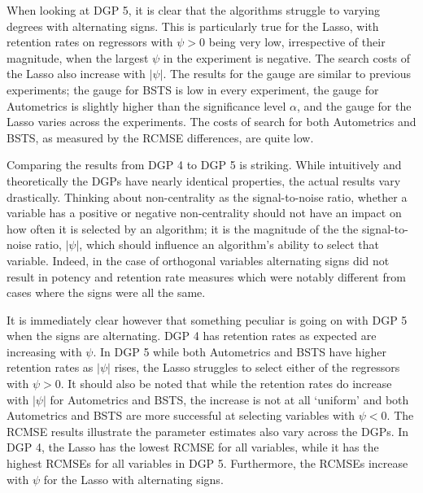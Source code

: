 When looking at DGP 5, it is clear that the algorithms struggle to varying degrees with alternating signs. This is particularly true for the Lasso, with retention rates on regressors with $\psi>0$ being very low, irrespective of their magnitude, when the largest $\psi$ in the experiment is negative. The search costs of the Lasso also increase with $|\psi|$. The results for the gauge are similar to previous experiments; the gauge for BSTS is low in every experiment, the gauge for Autometrics is slightly higher than the significance level $\alpha$, and the gauge for the Lasso varies across the experiments. The costs of search for both Autometrics and BSTS, as measured by the RCMSE differences, are quite low. 

Comparing the results from DGP 4 to DGP 5 is striking. While intuitively and theoretically the DGPs have nearly identical properties, the actual results vary drastically. Thinking about non-centrality as the signal-to-noise ratio, whether a variable has a positive or negative non-centrality should not have an impact on how often it is selected by an algorithm; it is the magnitude of the the signal-to-noise ratio, $|\psi|$, which should influence an algorithm's ability to select that variable. Indeed, in the case of orthogonal variables alternating signs did not result in potency and retention rate measures which were notably different from cases where the signs were all the same. 

It is immediately clear however that something peculiar is going on with DGP 5 when the signs are alternating. DGP 4 has retention rates as expected are increasing with $\psi$. In DGP 5 while both Autometrics and BSTS have higher retention rates as $|\psi|$ rises, the Lasso struggles to select either of the regressors with $\psi>0$. It should also be noted that while the retention rates do increase with $|\psi|$ for Autometrics and BSTS, the increase is not at all `uniform' and both Autometrics and BSTS are more successful at selecting variables with $\psi<0$. The RCMSE results illustrate the parameter estimates also vary across the DGPs. In DGP 4, the Lasso has the lowest RCMSE for all variables, while it has the highest RCMSEs for all variables in DGP 5. Furthermore, the RCMSEs increase with $\psi$ for the Lasso with alternating signs. 

